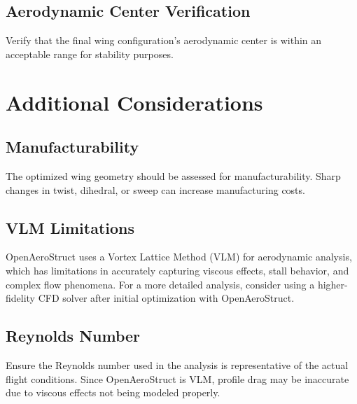 \documentclass{article}
\begin{document}
\subsection{Aerodynamic Center Verification}
Verify that the final wing configuration's aerodynamic center is within an acceptable range for stability purposes.

\section{Additional Considerations}

\subsection{Manufacturability}
The optimized wing geometry should be assessed for manufacturability. Sharp changes in twist, dihedral, or sweep can increase manufacturing costs.

\subsection{VLM Limitations}
OpenAeroStruct uses a Vortex Lattice Method (VLM) for aerodynamic analysis, which has limitations in accurately capturing viscous effects, stall behavior, and complex flow phenomena. For a more detailed analysis, consider using a higher-fidelity CFD solver after initial optimization with OpenAeroStruct.

\subsection{Reynolds Number}
Ensure the Reynolds number used in the analysis is representative of the actual flight conditions. Since OpenAeroStruct is VLM, profile drag may be inaccurate due to viscous effects not being modeled properly.
\end{document}

